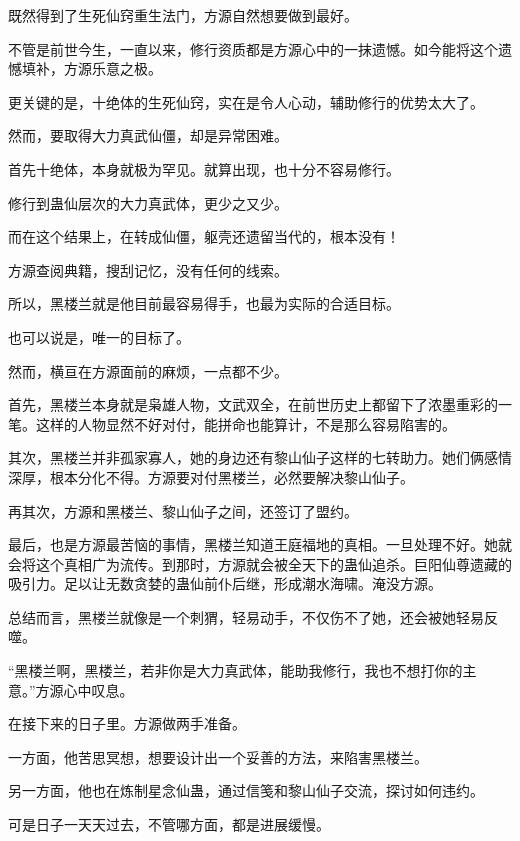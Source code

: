 
\begin{this_body}

既然得到了生死仙窍重生法门，方源自然想要做到最好。

不管是前世今生，一直以来，修行资质都是方源心中的一抹遗憾。如今能将这个遗憾填补，方源乐意之极。

更关键的是，十绝体的生死仙窍，实在是令人心动，辅助修行的优势太大了。

然而，要取得大力真武仙僵，却是异常困难。

首先十绝体，本身就极为罕见。就算出现，也十分不容易修行。

修行到蛊仙层次的大力真武体，更少之又少。

而在这个结果上，在转成仙僵，躯壳还遗留当代的，根本没有！

方源查阅典籍，搜刮记忆，没有任何的线索。

所以，黑楼兰就是他目前最容易得手，也最为实际的合适目标。

也可以说是，唯一的目标了。

然而，横亘在方源面前的麻烦，一点都不少。

首先，黑楼兰本身就是枭雄人物，文武双全，在前世历史上都留下了浓墨重彩的一笔。这样的人物显然不好对付，能拼命也能算计，不是那么容易陷害的。

其次，黑楼兰并非孤家寡人，她的身边还有黎山仙子这样的七转助力。她们俩感情深厚，根本分化不得。方源要对付黑楼兰，必然要解决黎山仙子。

再其次，方源和黑楼兰、黎山仙子之间，还签订了盟约。

最后，也是方源最苦恼的事情，黑楼兰知道王庭福地的真相。一旦处理不好。她就会将这个真相广为流传。到那时，方源就会被全天下的蛊仙追杀。巨阳仙尊遗藏的吸引力。足以让无数贪婪的蛊仙前仆后继，形成潮水海啸。淹没方源。

总结而言，黑楼兰就像是一个刺猬，轻易动手，不仅伤不了她，还会被她轻易反噬。

“黑楼兰啊，黑楼兰，若非你是大力真武体，能助我修行，我也不想打你的主意。”方源心中叹息。

在接下来的日子里。方源做两手准备。

一方面，他苦思冥想，想要设计出一个妥善的方法，来陷害黑楼兰。

另一方面，他也在炼制星念仙蛊，通过信笺和黎山仙子交流，探讨如何违约。

可是日子一天天过去，不管哪方面，都是进展缓慢。


\end{this_body}
